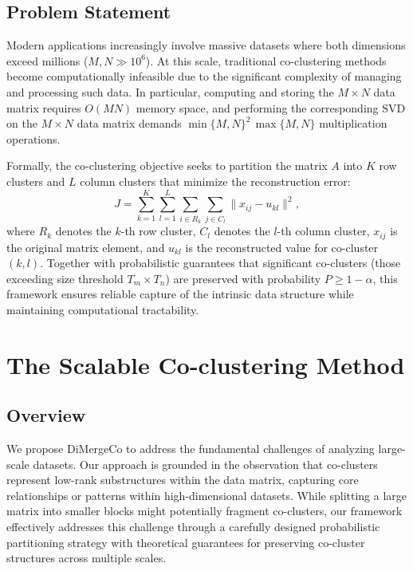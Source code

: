 \documentclass[journal]{IEEEtran}
\theoremstyle{definition}
\theoremstyle{remark} %
\begin{document}
\subsection{Problem Statement}
\label{subsec:problem-statement}
Modern applications increasingly involve massive datasets where both dimensions exceed millions ($M, N \gg 10^6$). At this scale, traditional co-clustering methods become computationally infeasible due to the significant complexity of managing and processing such data. {\color{blue}In particular, computing and storing the $M \times N$ data matrix requires $O(MN)$ memory space, and performing the corresponding SVD on the $M \times N$ data matrix demands $\min\{M,N\}^2\,\max\{M,N\}$ multiplication operations.}

    {\color{blue}Formally, the co-clustering objective seeks to partition the matrix $A$ into $K$ row clusters and $L$ column clusters that minimize the reconstruction error:
        \begin{equation}\label{eq:co-clustering-objective}
            J = \sum_{k=1}^{K} \sum_{l=1}^{L} \sum_{i \in R_k} \sum_{j \in C_l} \| x_{ij} - u_{kl} \|^2,
        \end{equation}
        where $R_k$ denotes the $k$-th row cluster, $C_l$ denotes the $l$-th column cluster, $x_{ij}$ is the original matrix element, and $u_{kl}$ is the reconstructed value for co-cluster $(k,l)$.}
Together with probabilistic guarantees that significant co-clusters (those exceeding size threshold $T_m \times T_n$) are preserved with probability $P \geq 1 - \alpha$, this framework ensures reliable capture of the intrinsic data structure while maintaining computational tractability.

\section{The Scalable Co-clustering Method}
\label{sec:proposed-model}

\subsection{Overview}
\label{subsec:overview}
We propose DiMergeCo to address the fundamental challenges of analyzing large-scale datasets. Our approach is grounded in the observation that co-clusters represent low-rank substructures within the data matrix, capturing core relationships or patterns within high-dimensional datasets. While splitting a large matrix into smaller blocks might potentially fragment co-clusters, our framework effectively addresses this challenge through a carefully designed probabilistic partitioning strategy with theoretical guarantees for preserving co-cluster structures across multiple scales.
\end{document}
